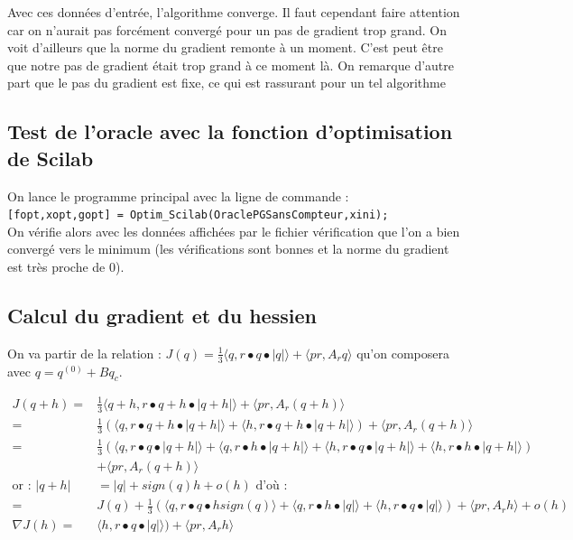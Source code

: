 \documentclass[11pt]{article}
\begin{document}
Avec ces données d'entrée, l'algorithme converge. Il faut cependant faire attention car on n'aurait pas forcément convergé pour un pas de gradient trop grand. On voit d'ailleurs que la norme du gradient remonte à un moment. C'est peut être que notre pas de gradient était trop grand à ce moment là. On remarque d'autre part que le pas du gradient est fixe, ce qui est rassurant pour un tel algorithme

\subsection*{Test de l'oracle avec la fonction d'optimisation de Scilab}

On lance le programme principal avec la ligne de commande :\\
\texttt{[fopt,xopt,gopt] = Optim\_Scilab(OraclePGSansCompteur,xini);}\\
On vérifie alors avec les données affichées par le fichier vérification que l'on a bien convergé vers le minimum (les vérifications sont bonnes et la norme du gradient est très proche de 0).


\subsection{Calcul du gradient et du hessien}

On va partir de la relation : $ J(q) = \frac{1}{3}\langle q , r \bullet q \bullet | q | \rangle + \langle pr , A_r q \rangle$ qu'on composera avec $q = q^{(0)} + B q_c$.

\begin{align*}
J(q+h) =& \frac{1}{3}\langle q + h , r \bullet q + h \bullet | q + h | \rangle + \langle pr , A_r (q + h) \rangle \\
=& \frac{1}{3}(\langle q , r \bullet q + h \bullet | q + h | \rangle + \langle h , r \bullet q + h \bullet | q + h | \rangle) + \langle pr , A_r (q + h) \rangle \\
=& \frac{1}{3}(\langle q , r \bullet q \bullet | q + h | \rangle + \langle q , r \bullet h \bullet | q + h | \rangle + \langle h , r \bullet q \bullet | q + h | \rangle + \langle h , r \bullet h \bullet | q + h | \rangle) \\ &+ \langle pr , A_r (q + h) \rangle \\
\text{or : } | q + h | &= |q| + sign(q) h + o(h) \text{ d'où :} \\
=& J(q) + \frac{1}{3}(\langle q , r \bullet q \bullet h sign(q) \rangle + \langle q , r \bullet h \bullet | q | \rangle + \langle h , r \bullet q \bullet | q | \rangle) + \langle pr , A_r h \rangle + o(h) \\
\nabla J(h) =& \langle h , r \bullet q \bullet | q | \rangle) + \langle pr , A_r h \rangle
\end{align*}
\end{document}
